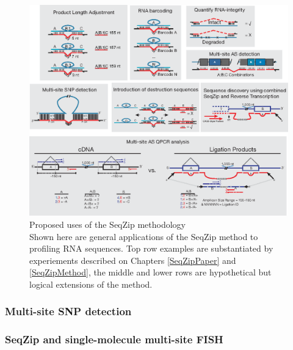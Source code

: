     \begin{figure} %
      \centering 
      \includegraphics{Figures/Discussion/SeqZipUses.eps}
      \caption[Proposed uses of the SeqZip methodology]
      {Proposed uses of the SeqZip methodology \\[0.25cm]
        Shown here are general applications of the SeqZip method to profiling RNA sequences. Top row examples are substantiated by experiements described on Chapters \ref{SeqZipPaper} and \ref{SeqZipMethod}, the middle and lower rows are hypothetical but logical extensions of the method.
        }
      \label{Disc:fig: Panel of SeqZip Applications}
      \end{figure}

    \subsubsection{Multi-site SNP detection}
      \label{Disc:subsubsec: Multi-site SNP Detection}


    \subsubsection{SeqZip and single-molecule multi-site FISH}
      \label{Disc:subsubsec:SeqZip and Single-Molecule FISH}

